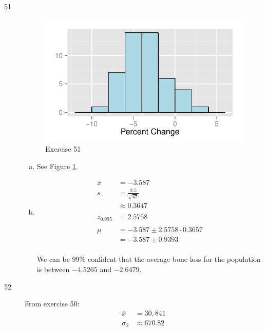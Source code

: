 \documentclass[letterpaper]{exam}
\begin{document}
\begin{description}
      \item[51]
        \begin{figure}[H]
          \centering
          \includegraphics{ex51.pdf}
          \caption{Exercise 51}
          \label{fig:ex51}
        \end{figure}

        \begin{enumerate}[(a)]
          \item See Figure \ref{fig:ex51}. 

          \item
            \begin{align*}
              \bar{x} & = -3.587 \\
              s       & = \frac{2.5}{\sqrt{47}} \\
                      & \approx 0.3647 \\
              \\
              z_{0.995} & = 2.5758 \\
              \\
              \mu & = -3.587 \pm 2.5758 \cdot 0.3657 \\
                  & = -3.587 \pm 0.9393 \\
            \end{align*}

            We can be 99\% confident that the average bone loss for the
            population is between $-4.5265$ and $-2.6479$.

        \end{enumerate}

      \item[52]
        \begin{enumerate}[(a)]
          From exercise 50:
          \begin{align*}
            \bar{x}          & = 30,841 \\
            \sigma_{\bar{x}} & \approx 670.82 \\
          \end{align*}


\end{enumerate}
\end{description}
\end{document}
